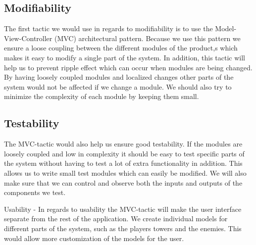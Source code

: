 \label{tactics}

\subsection{Modifiability}

The first tactic we would use in regards to modifiability is to use the Model-View-Controller (MVC) architectural pattern. Because we use this
pattern we ensure a loose coupling between the different modules of the product,s which makes it easy to modify a single part of the system. In
addition, this tactic will help us to prevent ripple effect which can occur when
modules are being changed. By having loosely coupled modules and localized
changes other parts of the system would not be affected if we change a module.
We should also try to minimize the complexity of each module by keeping them
small.

\subsection{Testability}
The MVC-tactic would also help us ensure good testability. If the
modules are loosely coupled and low in complexity it should be easy to test
specific parts of the system without having to test a lot of extra functionality
in addition. This allows us to write small test modules which can easily be
modified. We will also make sure that we can control and observe both the inputs
and outputs of the components we test.

Usability - In regards to usability the MVC-tactic will make the user interface
separate from the rest of the application. We create individual models for different parts of the system, such as the players towers and the enemies. This would allow more customization of the models for the user.
